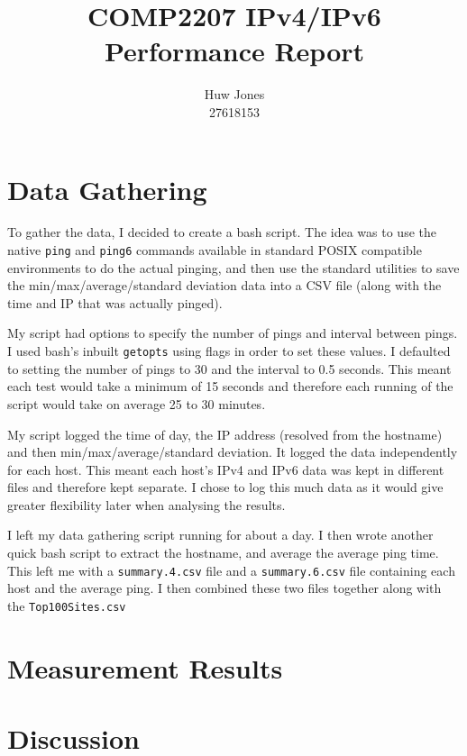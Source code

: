\documentclass[a4paper]{article}
\author{Huw Jones \\27618153}
\title{COMP2207 IPv4/IPv6 Performance Report}
\begin{document}
\maketitle
\newpage

\section{Data Gathering}
To gather the data, I decided to create a bash script.
The idea was to use the native \texttt{ping} and \texttt{ping6} commands available in standard POSIX compatible environments to do the actual pinging,
and then use the standard utilities to save the min/max/average/standard deviation data into a CSV file (along with the time and IP that was actually pinged).

My script had options to specify the number of pings and interval between pings.
I used bash's inbuilt \texttt{getopts} using flags in order to set these values.
I defaulted to setting the number of pings to 30 and the interval to 0.5 seconds.
This meant each test would take a minimum of 15 seconds and therefore each running of the script would take on average 25 to 30 minutes.

My script logged the time of day, the IP address (resolved from the hostname) and then min/max/average/standard deviation.
It logged the data independently for each host.
This meant each host's IPv4 and IPv6 data was kept in different files and therefore kept separate.
I chose to log this much data as it would give greater flexibility later when analysing the results.

I left my data gathering script running for about a day.
I then wrote another quick bash script to extract the hostname, and average the average ping time.
This left me with a \texttt{summary.4.csv} file and a \texttt{summary.6.csv} file containing each host and the average ping.
I then combined these two files together along with the \texttt{Top100Sites.csv}

\section{Measurement Results}

\section{Discussion}
\end{document}
